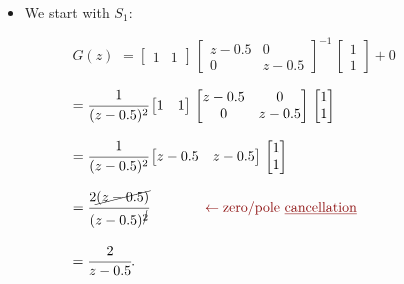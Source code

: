 \begin{frame}
\myPause
 \begin{itemize}[<+-| alert@+>]
 \item We start with $S_1$:
       \begin{itemize}
       \item[] \begin{itemize}[<+-| alert@+>]
               \item[$G(z)$] \vspace{1mm}
                    $= \begin{bmatrix} 1 & 1  \end{bmatrix} \,
                       \begin{bmatrix} z-0.5 & 0 \\
                                       0     & z-0.5 \end{bmatrix}^{-1} \,
                       \begin{bmatrix} 1 \\ 1 \end{bmatrix}
                       +0
                    $
               \item[] \vspace{1mm}
                    $= \cfrac{1}{(z-0.5)^2}
                       \begin{bmatrix} 1 & 1 \end{bmatrix} \,
                       \begin{bmatrix} z-0.5 & 0 \\
                                       0     & z-0.5 \end{bmatrix} \,
                       \begin{bmatrix} 1 \\ 1 \end{bmatrix}
                    $
               \item[] \vspace{1mm}
                    $= \cfrac{1}{(z-0.5)^2}
                       \begin{bmatrix} z-0.5 & z-0.5 \end{bmatrix} \,
                       \begin{bmatrix} 1 \\ 1 \end{bmatrix}
                    $
               \item[] \vspace{1mm}
                    $= \cfrac{2\cancel{(z-0.5)}}{(z-0.5)^{\cancel{2}}} \qquad \qquad
                       \TC{\leftarrow \text{zero/pole \underline{cancellation}}}
                    $
               \item[] \vspace{1mm}
                    $= \cfrac{2}{z-0.5}.
                    $
               \end{itemize}
       \end{itemize}
 \end{itemize}
\end{frame}



